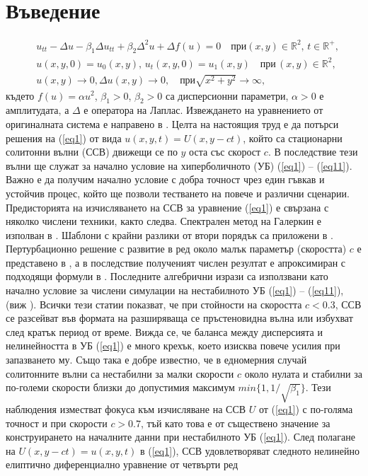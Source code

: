 \documentclass[a4paper]{article}
\newcommand{\rf}[1]{(\ref{#1})}
\newcommand{\RR}{\mathbb{R}}
\theoremstyle{remark}
\begin{document}
\section{Въведение}\label{introduction}

\begin{align}
&u_{tt} - \Delta u -\beta_1  \Delta u_{tt} +\beta_2 \Delta ^2 u + \Delta f(u)=0   \quad \text{при}  (x,y) \in \RR^2, \, t\in\RR^+,\label{eq1}
\\ \nonumber &u(x,y,0)=u_0(x,y), \, u_t(x,y,0)=u_1(x,y)   \quad\text{при} \, (x,y) \in \RR^2,
\\  &u(x,y) \rightarrow 0,  \Delta u(x,y) \rightarrow 0 ,  \quad \text{при}  \sqrt{x^2 + y^2} \rightarrow \infty, \label{eq11}
\end{align}
където $f(u)=\alpha u^2$, $\beta_1>0$, $\beta_2>0$ са дисперсионни параметри,  $\alpha>0$ е амплитудата, а $\Delta$ е оператора на Лаплас. Извеждането на уравнението от оригиналната система е направено в \cite{ChChr}. Целта на настоящия труд е да потърси решения на \rf{eq1} от вида $u(x,y,t)=U(x,y-ct)$, който са стационарни солитонни вълни (ССВ) движещи се по $y$ оста със скорост $c$. В последствие тези вълни ще служат за начално условие на хиперболичното (УБ) \rf{eq1} -- \rf{eq11}. Важно е да получим начално условие с добра точност чрез един гъвкав и устойчив процес, който ще позволи тестването на повече и различни сценарии. Предисторията на изчисляването на ССВ за уравнение \rf{eq1} е свързана с няколко числени техники, както следва. Спектрален метод на Галеркин е изполван в \cite{chr-chr-07,chr-chr}. Шаблони с крайни разлики от втори порядък са приложени в \cite{Ch2012}. Пертурбационно решение с развитие в ред около малък параметър (скоростта) $c$ е представено в  \cite{Ch2011}, а в последствие полученият числен резултат е апроксимиран с подходящи формули в \cite{Ch2011}. Последните алгебрични изрази са използвани като начално условие за числени симулации на нестабилното УБ \rf{eq1} -- \rf{eq11}, (виж  \cite{ref21, dani, milenaDani, ref22}). Всички тези статии показват, че при стойности на скоростта $c<0.3$, ССВ се разсейват във формата на разширяваща се пръстеновидна вълна или избухват след кратък период от време. Вижда се, че баланса между дисперсията и нелинейността в УБ \rf{eq1} е много крехък, което изисква повече усилия при запазването му. Също така е добре известно, че в едномерния случай солитонните вълни са нестабилни за малки скорости $c$ около нулата и стабилни за по-големи скорости близки до допустимия максимум $min\{1, 1/\sqrt{\beta_1}\}$.
Тези наблюдения изместват фокуса към изчисляване на ССВ $U$ от \rf{eq1} с по-голяма точност и при скорости $c > 0.7$, тъй като това е от съществено значение за конструирането на началните данни при нестабилното УБ \rf{eq1}. 
След полагане на $U(x,y-ct)=u(x,y,t)$ в \rf{eq1}, ССВ удовлетворяват следното нелинейно елиптично диференциално уравнение от четвърти ред
\end{document}
